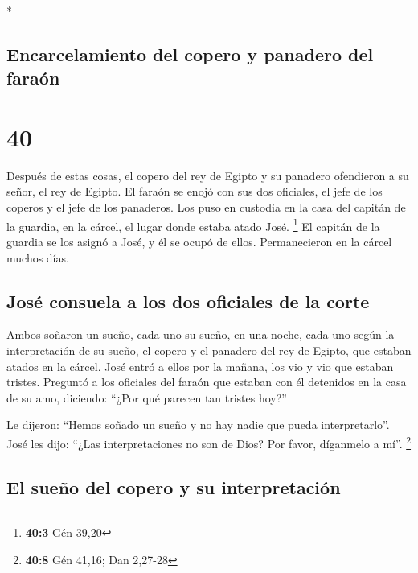 \begin{paracol}{2}
\begin{otherlanguage}{english}
\end{otherlanguage}

\switchcolumn[0]*

\hypertarget{encarcelamiento-del-copero-y-panadero-del-farauxf3n}{%
\subsection{Encarcelamiento del copero y panadero del
faraón}\label{encarcelamiento-del-copero-y-panadero-del-farauxf3n}}

\hypertarget{section-78}{%
\section{40}\label{section-78}}

 Después de estas cosas, el copero del rey de Egipto y su
panadero ofendieron a su señor, el rey de Egipto.  El
faraón se enojó con sus dos oficiales, el jefe de los coperos y el jefe
de los panaderos.  Los puso en custodia en la casa del
capitán de la guardia, en la cárcel, el lugar donde estaba atado José.
\footnote{\textbf{40:3} Gén 39,20}  El capitán de la
guardia se los asignó a José, y él se ocupó de ellos. Permanecieron en
la cárcel muchos días.

\hypertarget{josuxe9-consuela-a-los-dos-oficiales-de-la-corte}{%
\subsection{José consuela a los dos oficiales de la
corte}\label{josuxe9-consuela-a-los-dos-oficiales-de-la-corte}}

 Ambos soñaron un sueño, cada uno su sueño, en una noche,
cada uno según la interpretación de su sueño, el copero y el panadero
del rey de Egipto, que estaban atados en la cárcel.  José
entró a ellos por la mañana, los vio y vio que estaban tristes.
 Preguntó a los oficiales del faraón que estaban con él
detenidos en la casa de su amo, diciendo: ``¿Por qué parecen tan tristes
hoy?''

 Le dijeron: ``Hemos soñado un sueño y no hay nadie que
pueda interpretarlo''. José les dijo: ``¿Las interpretaciones no son de
Dios? Por favor, díganmelo a mí''. \footnote{\textbf{40:8} Gén 41,16;
  Dan 2,27-28}

\hypertarget{el-sueuxf1o-del-copero-y-su-interpretaciuxf3n}{%
\subsection{El sueño del copero y su
interpretación}\label{el-sueuxf1o-del-copero-y-su-interpretaciuxf3n}}


\end{paracol}
